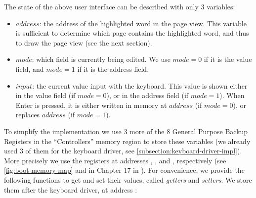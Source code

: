 The state of the above user interface can be described with only 3 variables:

\begin{itemize}
  \item $address$: the address of the highlighted word in the page view. This
  variable is sufficient to determine which page contains the highlighted word,
  and thus to draw the page view (see the next section).

  \item $mode$: which field is currently being edited. We use $mode=0$ if it is
  the value field, and $mode=1$ if it is the address field.

  \item $input$: the current value input with the keyboard. This value is shown
  either in the value field (if $mode=0$), or in the address field (if
  $mode=1$). When Enter is pressed, it is either written in memory at $address$
  (if $mode=0$), or replaces $address$ (if $mode=1$).
\end{itemize}


To simplify the implementation we use 3 more of the 8 General Purpose Backup
Registers in the ``Controllers'' memory region to store these variables (we
already used 3 of them for the keyboard driver, see
\cref{subsection:keyboard-driver-impl}). More precisely we use the registers at
addresses , , and ,
respectively (see \cref{fig:boot-memory-map} and in Chapter 17 in
\cite{SAM3X8E}). For convenience, we provide the following functions to get and
set their values, called {\em getters} and {\em setters}. We store them after
the keyboard driver, at address :

